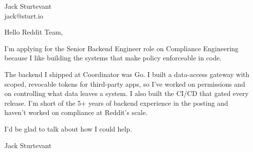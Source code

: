 \documentclass[11pt]{article}
\begin{document}
\raggedright

{\namefont\fontsize{20pt}{24pt}\selectfont Jack Sturtevant}\\[-0.3em]
jack@sturt.io

\vspace{1.2em}

Hello Reddit Team,

I'm applying for the Senior Backend Engineer role on Compliance Engineering because I like building the systems that make policy enforceable in code.

The backend I shipped at Coordinator was Go. I built a data-access gateway with scoped, revocable tokens for third-party apps, so I've worked on permissions and on controlling what data leaves a system. I also built the CI/CD that gated every release. I'm short of the 5+ years of backend experience in the posting and haven't worked on compliance at Reddit's scale.

I'd be glad to talk about how I could help.

\vspace{0.6em}
Jack Sturtevant
\end{document}
